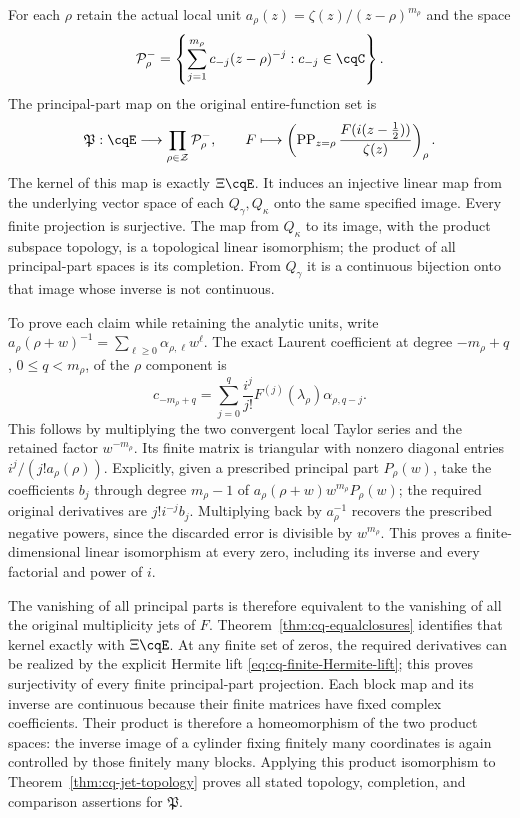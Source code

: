 For each $\rho$ retain the actual local unit
$a_\rho(z)=\zeta(z)/(z-\rho)^{m_\rho}$ and the space
\[
 \mathcal P_\rho^-=
  \left\{\sum_{j=1}^{m_\rho}c_{-j}(z-\rho)^{-j}:c_{-j}\in\cqC\right\}.
\]
The principal-part map on the original entire-function set is
\begin{equation}\label{eq:cq-principalparts}
 \mathfrak P:\cqE\longrightarrow\prod_{\rho\in\mathcal Z}\mathcal P_\rho^-,
 \qquad
 F\longmapsto\left(\operatorname{PP}_{z=\rho}
                 \frac{F(i(z-\tfrac12))}{\zeta(z)}\right)_\rho.
\end{equation}
The kernel of this map is exactly $\Xi\cqE$. It induces an
injective linear map from the underlying vector space of each
$Q_\gamma,Q_\kappa$ onto the same specified image. Every finite
projection is surjective. The map from $Q_\kappa$ to its image,
with the product subspace topology, is a topological linear
isomorphism; the product of all principal-part spaces is its
completion. From $Q_\gamma$ it is a continuous bijection onto
that image whose inverse is not continuous.

To prove each claim while retaining the analytic units, write
$a_\rho(\rho+w)^{-1}=\sum_{\ell\geq0}\alpha_{\rho,\ell}w^\ell$.
The exact Laurent coefficient at degree $-m_\rho+q$, $0\leq q<m_\rho$,
of the $\rho$ component is
\begin{equation}\label{eq:cq-principalpart-coefficients}
 c_{-m_\rho+q}
 =\sum_{j=0}^{q}\frac{i^j}{j!}F^{(j)}(\lambda_\rho)
                                  \alpha_{\rho,q-j}.
\end{equation}
This follows by multiplying the two convergent local Taylor
series and the retained factor $w^{-m_\rho}$. Its finite matrix
is triangular with nonzero diagonal entries
$i^j/(j!a_\rho(\rho))$. Explicitly, given a prescribed principal
part $P_\rho(w)$, take the coefficients $b_j$ through degree
$m_\rho-1$ of $a_\rho(\rho+w)w^{m_\rho}P_\rho(w)$;
the required original derivatives are $j!i^{-j}b_j$.
Multiplying back by $a_\rho^{-1}$ recovers the prescribed negative
powers, since the discarded error is divisible by $w^{m_\rho}$.
This proves a finite-dimensional linear isomorphism at every zero,
including its inverse and every factorial and power of $i$.

The vanishing of all principal parts is therefore equivalent to
the vanishing of all the original multiplicity jets of $F$.
Theorem~\ref{thm:cq-equalclosures} identifies that kernel exactly
with $\Xi\cqE$. At any finite set of zeros, the required derivatives
can be realized by the explicit Hermite lift
\eqref{eq:cq-finite-Hermite-lift}; this proves surjectivity of
every finite principal-part projection. Each block map and its
inverse are continuous because their finite matrices have fixed
complex coefficients. Their product is therefore a homeomorphism
of the two product spaces: the inverse image of a cylinder fixing
finitely many coordinates is again controlled by those finitely
many blocks. Applying this product isomorphism to
Theorem~\ref{thm:cq-jet-topology} proves all stated topology,
completion, and comparison assertions for $\mathfrak P$.

